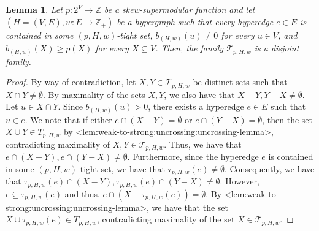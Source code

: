 \documentclass{article}
\def\Cref#1{<#1>}%
\newtheorem{lemma}{Lemma}[section]
\newcommand{\maximalTightSetFamily}[1]{\ensuremath{\calT_{#1}}\xspace}
\newcommand{\tightSetFamily}[1]{\ensuremath{T_{#1}}\xspace}
\newcommand{\maximalTightSetContainingHyperedge}[1]{\ensuremath{\tau_{#1}}\xspace}
\providecommand{\Z}{\mathbb{Z}}
\providecommand{\calT}{\mathcal{T}}
\begin{document}
\begin{lemma}\label{lem:weak-to-strong:uncrossing:maximal-tight-set-family-disjoint}
    Let $p:2^V\rightarrow\Z$ be a skew-supermodular function and let $\left(H = (V, E), w:E \rightarrow\Z_+\right)$ be a hypergraph 
    such that every hyperedge $e \in E$ is contained in some $(p, H, w)$-tight set, $b_{(H,w)}(u) \not = 0$ for every $u \in V$, and $b_{(H,w)}(X) \geq p(X)$ for every $X \subseteq V$. 
    Then, the family $\maximalTightSetFamily{p, H, w}$ is a disjoint family.
\end{lemma}
\begin{proof}
By way of contradiction, let $X, Y \in \maximalTightSetFamily{p, H, w}$ be distinct sets such that $X\cap Y \not = \emptyset$. By maximality of the sets $X, Y$, we also have that $X - Y, Y - X \not = \emptyset$. Let $u \in X\cap Y$. Since $b_{(H,w)}(u) > 0$, there exists a hyperedge $e \in E$ such that $u \in e$. We note that if either $e\cap (X - Y) = \emptyset$ or $e\cap (Y - X) = \emptyset$, then the set $X \cup Y \in \tightSetFamily{p, H, w}$ by \Cref{lem:weak-to-strong:uncrossing:uncrossing-lemma}, contradicting maximality of $X, Y \in \maximalTightSetFamily{p, H, w}$. Thus, we have that $e \cap (X - Y), e \cap (Y - X) \not= \emptyset$. Furthermore, since the hyperedge $e$ is contained in some $(p, H, w)$-tight set, we have that  $\maximalTightSetContainingHyperedge{p, H, w}(e) \not = \emptyset$. Consequently, we have that $\maximalTightSetContainingHyperedge{p, H, w}(e)\cap (X - Y), \maximalTightSetContainingHyperedge{p, H, w}(e) \cap (Y - X) \not = \emptyset$. However, $e \subseteq \maximalTightSetContainingHyperedge{p, H, w}(e)$ and thus, $e \cap (X - \maximalTightSetContainingHyperedge{p, H, w}(e)) = \emptyset$. By \Cref{lem:weak-to-strong:uncrossing:uncrossing-lemma}, we have that the set $X \cup \maximalTightSetContainingHyperedge{p, H, w}(e) \in \tightSetFamily{p, H, w}$, contradicting maximality of the set $X \in \maximalTightSetFamily{p, H, w}$.
\end{proof}
\end{document}
